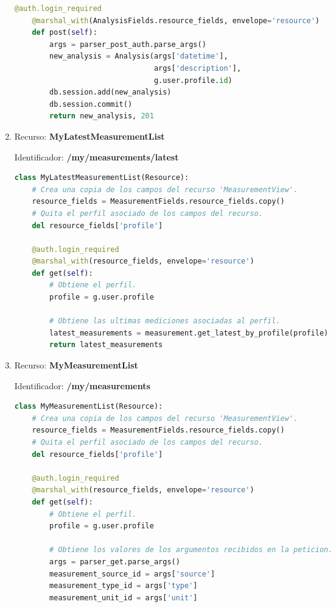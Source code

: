 \documentclass[a4paper,12pt]{article}
\begin{document}
\begin{enumerate}
\begin{lstlisting}[language=Python]
    @auth.login_required
    @marshal_with(AnalysisFields.resource_fields, envelope='resource')
    def post(self):
        args = parser_post_auth.parse_args()
        new_analysis = Analysis(args['datetime'],
                                args['description'],
                                g.user.profile.id)
        db.session.add(new_analysis)
        db.session.commit()
        return new_analysis, 201
\end{lstlisting}

\item Recurso: \textbf{MyLatestMeasurementList}

Identificador: \textbf{/my/measurements/latest}

\begin{lstlisting}[language=Python]
class MyLatestMeasurementList(Resource):
    # Crea una copia de los campos del recurso 'MeasurementView'.
    resource_fields = MeasurementFields.resource_fields.copy()
    # Quita el perfil asociado de los campos del recurso.
    del resource_fields['profile']

    @auth.login_required
    @marshal_with(resource_fields, envelope='resource')
    def get(self):
        # Obtiene el perfil.
        profile = g.user.profile

        # Obtiene las ultimas mediciones asociadas al perfil.
        latest_measurements = measurement.get_latest_by_profile(profile)
        return latest_measurements
\end{lstlisting}

\item Recurso: \textbf{MyMeasurementList}

Identificador: \textbf{/my/measurements}

\begin{lstlisting}[language=Python]
class MyMeasurementList(Resource):
    # Crea una copia de los campos del recurso 'MeasurementView'.
    resource_fields = MeasurementFields.resource_fields.copy()
    # Quita el perfil asociado de los campos del recurso.
    del resource_fields['profile']

    @auth.login_required
    @marshal_with(resource_fields, envelope='resource')
    def get(self):
        # Obtiene el perfil.
        profile = g.user.profile

        # Obtiene los valores de los argumentos recibidos en la peticion.
        args = parser_get.parse_args()
        measurement_source_id = args['source']
        measurement_type_id = args['type']
        measurement_unit_id = args['unit']


\end{lstlisting}
\end{enumerate}
\end{document}
